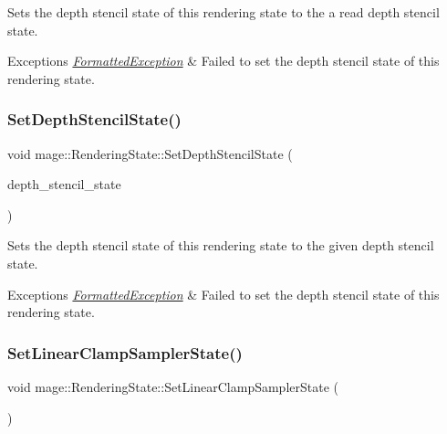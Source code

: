 Sets the depth stencil state of this rendering state to the a read depth stencil state.


\begin{DoxyExceptions}{Exceptions}
{\em \hyperlink{structmage_1_1_formatted_exception}{Formatted\+Exception}} & Failed to set the depth stencil state of this rendering state. \\
\hline
\end{DoxyExceptions}
\hypertarget{structmage_1_1_rendering_state_ad6081a1d840e30f58a8090f80e59b8fe}{}\label{structmage_1_1_rendering_state_ad6081a1d840e30f58a8090f80e59b8fe} 
\subsubsection{\texorpdfstring{Set\+Depth\+Stencil\+State()}{SetDepthStencilState()}}
{\footnotesize\ttfamily void mage\+::\+Rendering\+State\+::\+Set\+Depth\+Stencil\+State (\begin{DoxyParamCaption}\item[{I\+D3\+D11\+Depth\+Stencil\+State $\ast$}]{depth\+\_\+stencil\+\_\+state }\end{DoxyParamCaption})\hspace{0.3cm}{\ttfamily [noexcept]}}

Sets the depth stencil state of this rendering state to the given depth stencil state.


\begin{DoxyExceptions}{Exceptions}
{\em \hyperlink{structmage_1_1_formatted_exception}{Formatted\+Exception}} & Failed to set the depth stencil state of this rendering state. \\
\hline
\end{DoxyExceptions}
\hypertarget{structmage_1_1_rendering_state_a4f414c7bed884194bd93d89f893c86b4}{}\label{structmage_1_1_rendering_state_a4f414c7bed884194bd93d89f893c86b4} 
\subsubsection{\texorpdfstring{Set\+Linear\+Clamp\+Sampler\+State()}{SetLinearClampSamplerState()}}
{\footnotesize\ttfamily void mage\+::\+Rendering\+State\+::\+Set\+Linear\+Clamp\+Sampler\+State (\begin{DoxyParamCaption}{ }\end{DoxyParamCaption})}

